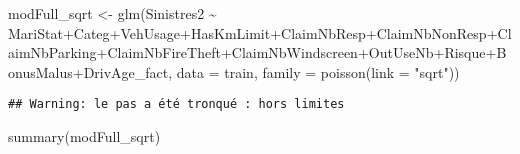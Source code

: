 \documentclass[
]{article}
\newenvironment{Shaded}{\begin{snugshade}}{\end{snugshade}}
\newcommand{\AttributeTok}[1]{\textcolor[rgb]{0.77,0.63,0.00}{#1}}
\newcommand{\FunctionTok}[1]{\textcolor[rgb]{0.00,0.00,0.00}{#1}}
\newcommand{\NormalTok}[1]{#1}
\newcommand{\OtherTok}[1]{\textcolor[rgb]{0.56,0.35,0.01}{#1}}
\newcommand{\SpecialCharTok}[1]{\textcolor[rgb]{0.00,0.00,0.00}{#1}}
\newcommand{\StringTok}[1]{\textcolor[rgb]{0.31,0.60,0.02}{#1}}
\begin{document}
\begin{Shaded}
\begin{Highlighting}[]
\NormalTok{modFull\_sqrt }\OtherTok{\textless{}{-}} \FunctionTok{glm}\NormalTok{(Sinistres2 }\SpecialCharTok{\textasciitilde{}}\NormalTok{ MariStat}\SpecialCharTok{+}\NormalTok{Categ}\SpecialCharTok{+}\NormalTok{VehUsage}\SpecialCharTok{+}\NormalTok{HasKmLimit}\SpecialCharTok{+}\NormalTok{ClaimNbResp}\SpecialCharTok{+}\NormalTok{ClaimNbNonResp}\SpecialCharTok{+}\NormalTok{ClaimNbParking}\SpecialCharTok{+}\NormalTok{ClaimNbFireTheft}\SpecialCharTok{+}\NormalTok{ClaimNbWindscreen}\SpecialCharTok{+}\NormalTok{OutUseNb}\SpecialCharTok{+}\NormalTok{Risque}\SpecialCharTok{+}\NormalTok{BonusMalus}\SpecialCharTok{+}\NormalTok{DrivAge\_fact, }\AttributeTok{data =}\NormalTok{ train, }\AttributeTok{family =} \FunctionTok{poisson}\NormalTok{(}\AttributeTok{link =} \StringTok{"sqrt"}\NormalTok{))}
\end{Highlighting}
\end{Shaded}

\begin{verbatim}
## Warning: le pas a été tronqué : hors limites
\end{verbatim}

\begin{Shaded}
\begin{Highlighting}[]
\FunctionTok{summary}\NormalTok{(modFull\_sqrt)}
\end{Highlighting}
\end{Shaded}
\end{document}
